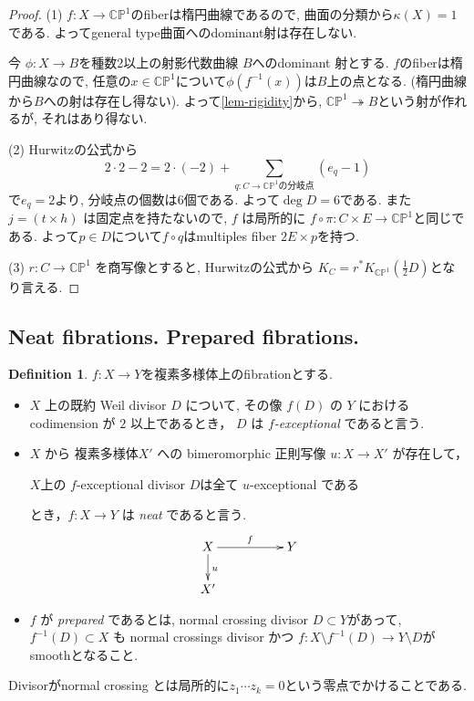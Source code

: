\documentclass[dvipdfmx,a4paper,11pt]{article} %
\theoremstyle{definition}
\newtheorem{defn}[thm]{Definition}
\theoremstyle{remark}
\numberwithin{equation}{section}
\newcommand{\C}{\mathbb{C}}
\begin{document}
\begin{proof}
(1) \( f  : X\to \C\mathbb{P}^1\)のfiberは楕円曲線であるので, 
曲面の分類から\( \kappa(X)=1 \) である. 
よってgeneral type曲面へのdominant射は存在しない.

今 \( \phi : X \to B \)を種数2以上の射影代数曲線 \( B \)へのdominant 射とする. 
$f$のfiberは楕円曲線なので, 任意の$x \in \C\mathbb{P}^1$について$\phi(f^{-1}(x))$は$B$上の点となる. 
(楕円曲線から$B$への射は存在し得ない). 
よって\ref{lem-rigidity}から, $\C\mathbb{P}^1 \twoheadrightarrow B$という射が作れるが, それはあり得ない. 

(2) Hurwitzの公式から
$$2\cdot 2 -  2 = 2\cdot( -2)+\sum_{q: \text{$C \to \C\mathbb{P}^1$の分岐点}}(e_q -1)
$$で$e_q=2$より, 分岐点の個数は$6$個である. 
よって$\deg D = 6$である. 
また\( j = (t \times h)  \) は固定点を持たないので, 
 \( f \) は局所的に \( f \circ \pi : C \times E \to \C\mathbb{P}^1 \)と同じである. 
 よって$p \in D$について\( f \circ q \)はmultiples fiber \( 2E \times p\)を持つ. 
 
(3)  \( r : C \to \C\mathbb{P}^1 \) を商写像とすると,  Hurwitzの公式から
\( K_C = r^* K_{\C\mathbb{P}^1}(\tfrac{1}{2} D) \)となり言える. 
\end{proof}



\subsection{Neat fibrations. Prepared fibrations. \cite[1.1.3.]{Cam04}}

\begin{defn}\cite[Definition 1.2]{Cam04}
$f : X \to Y$を複素多様体上のfibrationとする. 

\begin{itemize}
\item  \(X\) 上の既約 Weil divisor \(D\) について, その像 \(f(D)\) の
\(Y\) における codimension が \(2\) 以上であるとき，
\(D\) は \(f\)\emph{-exceptional} であると言う.
\item  \(X\) から 複素多様体\(X'\) への bimeromorphic 正則写像
\(u : X \to X'\) が存在して，
\begin{center}
$X$上の \(f\)-exceptional divisor $D$は全て
 \(u\)-exceptional である
\end{center}
とき，\(f : X \to Y\) は \emph{neat} であると言う.
  \[
\xymatrix@C=50pt@R=20pt{
X  \ar@{->}[d]^{u}\ar@{->}[r]^{f} &Y\\
 X' &\\
}
\]
\item \(f\) が \emph{prepared} であるとは, normal crossing divisor \(D \subset Y\)があって, 
 \(f^{-1}(D) \subset X\) も normal crossings divisor かつ
 $f : X \setminus f^{-1}(D) \to Y \setminus D$がsmoothとなること.
\end{itemize}
\end{defn}
Divisorがnormal crossing とは局所的に$z_1\cdots z_k=0$という零点でかけることである. 
\end{document}
